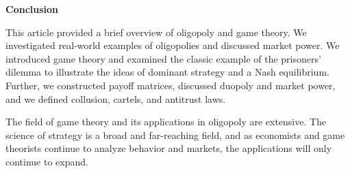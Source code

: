 \noindent
\textbf{Conclusion}

This article provided a brief overview of oligopoly and game theory. We investigated real-world examples of oligopolies and discussed market power. We introduced game theory and examined the classic example of the prisoners’ dilemma to illustrate the ideas of dominant strategy and a Nash equilibrium. Further, we constructed payoff matrices, discussed duopoly and market power, and we defined collusion, cartels, and antitrust laws.

The field of game theory and its applications in oligopoly are extensive. The science of strategy is a broad and far-reaching field, and as economists and game theorists continue to analyze behavior and markets, the applications will only continue to expand.


